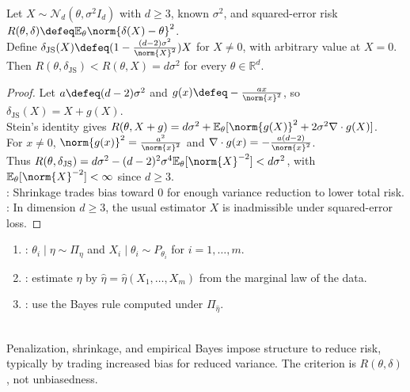 \begin{theorem} \label{thm:james-stein-phenomenon} \\
Let $X\sim\mathcal{N}_d(\theta,\sigma^2I_d)$ with $d\geq3$, known $\sigma^2$, and squared-error risk $R(\theta,\delta)\defeq\mathbb{E}_\theta\norm{\delta(X)-\theta}^2$.\\
Define $\delta_{\mathrm{JS}}(X)\defeq(1-\frac{(d-2)\sigma^2}{\norm{X}^2})X$ for $X\neq0$, with arbitrary value at $X=0$.\\
Then $R(\theta,\delta_{\mathrm{JS}})<R(\theta,X)=d\sigma^2$ for every $\theta\in\mathbb{R}^d$.
\begin{proof} Let $a\defeq(d-2)\sigma^2$ and $g(x)\defeq-\frac{ax}{\norm{x}^2}$, so $\delta_{\mathrm{JS}}(X)=X+g(X)$.\\
Stein's identity gives $R(\theta,X+g)=d\sigma^2+\mathbb{E}_\theta[\norm{g(X)}^2+2\sigma^2\nabla\cdot g(X)]$.\\
For $x\neq0$, $\norm{g(x)}^2=\frac{a^2}{\norm{x}^2}$ and $\nabla\cdot g(x)=-\frac{a(d-2)}{\norm{x}^2}$.\\
Thus $R(\theta,\delta_{\mathrm{JS}})=d\sigma^2-(d-2)^2\sigma^4\mathbb{E}_\theta[\norm{X}^{-2}]<d\sigma^2$, with $\mathbb{E}_\theta[\norm{X}^{-2}]<\infty$ since $d\geq3$.\\
: Shrinkage trades bias toward $0$ for enough variance reduction to lower total risk.\\
: In dimension $d\geq3$, the usual estimator $X$ is inadmissible under squared-error loss.
\end{proof}
\end{theorem}

\begin{definition} \label{def:empirical-bayes-rule} 
\begin{enumerate}[label=(\roman*)]
\setlength{\itemsep}{0pt}
\item {}: $\theta_i\mid\eta\sim\Pi_\eta$ and $X_i\mid\theta_i\sim P_{\theta_i}$ for $i=1,\ldots,m$.
\item {}: estimate $\eta$ by $\widehat{\eta}=\widehat{\eta}(X_1,\ldots,X_m)$ from the marginal law of the data.
\item {}: use the Bayes rule computed under $\Pi_{\widehat{\eta}}$.
\end{enumerate}
\end{definition}

\begin{remark} \label{rem:regularization-decision-theory} \\
Penalization, shrinkage, and empirical Bayes impose structure to reduce risk, typically by trading increased bias for reduced variance. The criterion is $R(\theta,\delta)$, not unbiasedness.
\end{remark}
